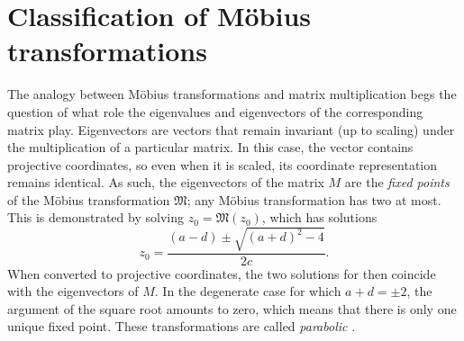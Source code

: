 \section{Classification of Möbius transformations}
\label{sec:classification}
The analogy between Möbius transformations and matrix multiplication begs the question  of what role the eigenvalues and eigenvectors of the corresponding matrix play. Eigenvectors are vectors that remain invariant (up to scaling) under the multiplication of a particular matrix. In this case, the vector contains projective coordinates, so even when it is scaled, its coordinate representation remains identical. As such, the eigenvectors of the matrix \(M\) are the \emph{fixed points} of the Möbius transformation \(\mathfrak{M}\); any Möbius transformation has two at most. This is demonstrated by solving \(z_0 = \mathfrak{M}(z_0)\), which has solutions
\[ z_0 = \frac{(a - d) \pm \sqrt{(a + d)^2 - 4}}{2c}.\]
When converted to projective coordinates, the two solutions for  then coincide with the eigenvectors of \(M\). In the degenerate case for which \(a + d = \pm2\), the argument of the square root amounts to zero, which means that there is only one unique fixed point. These transformations are called \emph{parabolic} \cite{Needham1997}.


